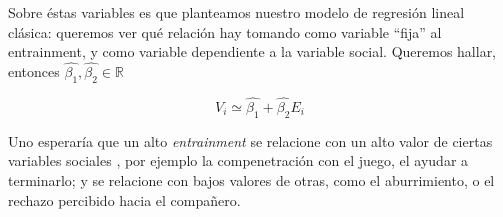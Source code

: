 Sobre éstas variables es que planteamos nuestro modelo de regresión lineal clásica: queremos ver qué relación hay tomando como variable ``fija'' al entrainment, y como variable dependiente a la variable social. Queremos hallar, entonces $\widehat{\beta_1}, \widehat{\beta_2} \in \mathbb{R}$

\begin{equation}
  V_i \simeq \widehat{\beta_1} + \widehat{\beta_2} E_i
\end{equation}


Uno esperaría que un alto \emph{entrainment} se relacione con un alto valor de ciertas variables sociales \cite{BRE1996}, por ejemplo la compenetración con el juego, el ayudar a terminarlo; y se relacione con bajos valores de otras, como el aburrimiento, o el rechazo percibido hacia el compañero.




